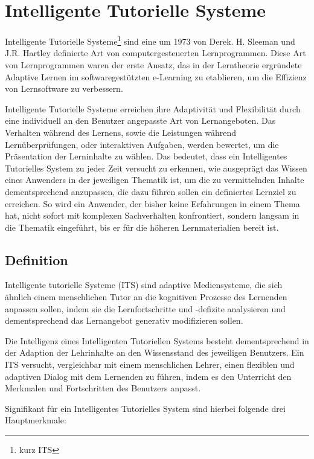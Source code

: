 \chapter{Intelligente Tutorielle Systeme}
Intelligente Tutorielle Systeme\footnote{kurz ITS} sind eine um 1973 von Derek. H. Sleeman
und J.R. Hartley definierte Art von computergesteuerten Lernprogrammen.
Diese Art von Lernprogrammen waren der erste Ansatz, das in der Lerntheorie
ergründete Adaptive Lernen im softwaregestützten e-Learning zu etablieren,
um die Effizienz von Lernsoftware zu verbessern.

Intelligente Tutorielle Systeme erreichen ihre Adaptivität und Flexibilität durch
eine individuell an den Benutzer angepasste Art von Lernangeboten.
Das Verhalten während des Lernens, sowie die Leistungen während Lernüberprüfungen,
oder interaktiven Aufgaben, werden bewertet, um die Präsentation der Lerninhalte zu wählen.
Das bedeutet, dass ein Intelligentes Tutorielles System zu jeder Zeit versucht zu erkennen,
wie ausgeprägt das Wissen eines Anwenders in der jeweiligen Thematik ist, um die
zu vermittelnden Inhalte dementsprechend anzupassen, die dazu führen sollen ein
definiertes Lernziel zu erreichen.
So wird ein Anwender, der bisher keine Erfahrungen in einem Thema hat, nicht sofort
mit komplexen Sachverhalten konfrontiert, sondern langsam in die Thematik eingeführt,
bis er für die höheren Lernmaterialien bereit ist.


\section{Definition}
\glqq Intelligente tutorielle Systeme (ITS) sind adaptive Mediensysteme, die sich ähnlich
einem menschlichen Tutor an die kognitiven Prozesse des Lernenden anpassen
sollen, indem sie die Lernfortschritte und -defizite analysieren und dementsprechend
das Lernangebot generativ modifizieren sollen.\grqq{} \cite[S. 555]{issing2002information}

Die Intelligenz eines Intelligenten Tutoriellen Systems besteht dementsprechend
in der Adaption der Lehrinhalte an den Wissensstand des jeweiligen Benutzers.
Ein ITS versucht, vergleichbar mit einem menschlichen Lehrer, einen flexiblen und adaptiven
Dialog mit dem Lernenden zu führen, indem es den Unterricht den Merkmalen und Fortschritten
des Benutzers anpasst.

Signifikant für ein Intelligentes Tutorielles System sind hierbei folgende drei Hauptmerkmale:

